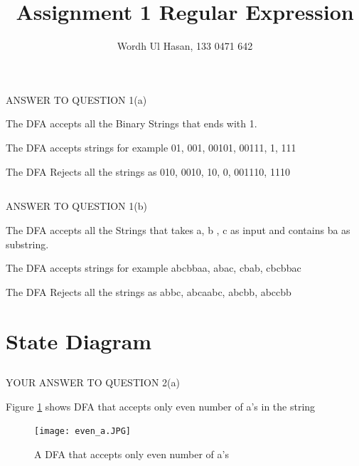 \documentclass{article}
\title{Assignment 1 Regular Expression}
\author{Wordh Ul Hasan, 133 0471 642}
\date{}
\begin{document}
\maketitle
 

\section{}

\subsection{}
ANSWER TO QUESTION 1(a)

The DFA accepts all the  Binary Strings that ends with 1.

The DFA accepts strings for example 01, 001, 00101, 00111, 1, 111

The DFA Rejects all the strings as 010, 0010, 10, 0, 001110, 1110

\subsection{}


ANSWER TO QUESTION 1(b)


The DFA accepts all the Strings that takes a, b , c as input and contains ba as substring.

The DFA accepts strings for example abcbbaa, abac, cbab, cbcbbac

The DFA Rejects all the strings as abbc, abcaabc, abcbb, abccbb

\section{State Diagram}

\subsection{}

YOUR ANSWER TO QUESTION 2(a)

Figure \ref{fig:even_a} shows DFA that accepts only even number of a's in the string
\begin{figure}
  \texttt{[image: even\_a.JPG]}
  \caption{A DFA that accepts only even number of a's}
  \label{fig:even_a}
\end{figure}

\subsection{}
\end{document}
